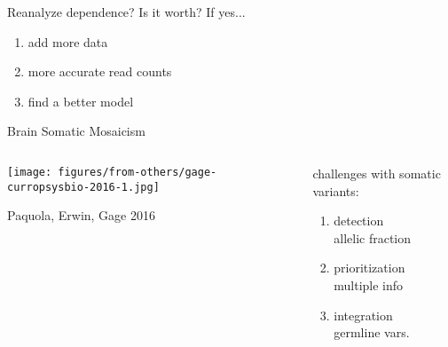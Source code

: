 \documentclass{beamer} %
\begin{document}
\begin{frame}{Reanalyze dependence?}
Is it worth? If yes...
\begin{enumerate}
\item add more data
\begin{itemize}
\end{itemize}
\item more accurate read counts
\begin{itemize}
\end{itemize}
\item find a better model
\begin{itemize}
\end{itemize}
\end{enumerate}
\end{frame}

\begin{frame}{Brain Somatic Mosaicism}
\begin{columns}[t]
\begin{column}{0.6\textwidth}

\texttt{[image: figures/from-others/gage-curropsysbio-2016-1.jpg]}

{\tiny Paquola, Erwin, Gage 2016}
\end{column}

\begin{column}{0.4\textwidth}
challenges with somatic variants:
\begin{enumerate}
\item detection\\
{\footnotesize allelic fraction}
\item prioritization\\{\footnotesize multiple info}
\item integration\\{\footnotesize germline vars.}
\end{enumerate}
\end{column}
\end{columns}
\end{frame}
\end{document}
